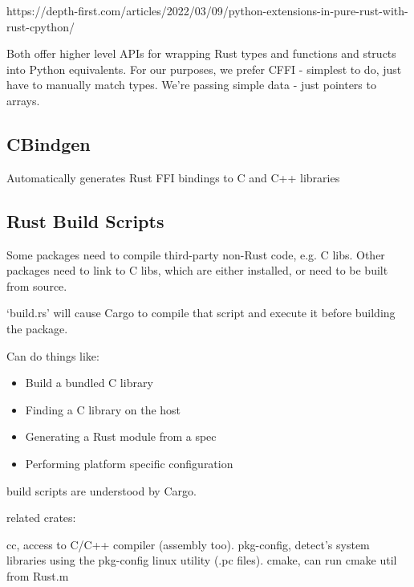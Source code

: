 \documentclass[12pt, a4, twoside]{article}
\begin{document}
https://depth-first.com/articles/2022/03/09/python-extensions-in-pure-rust-with-rust-cpython/

Both offer higher level APIs for wrapping Rust types and functions and structs into Python equivalents. For our purposes, we prefer CFFI - simplest to do, just have to manually match types. We're passing simple data - just pointers to arrays. 

\subsection*{CBindgen}

Automatically generates Rust FFI bindings to C and C++ libraries

\subsection*{Rust Build Scripts}

Some packages need to compile third-party non-Rust code, e.g. C libs. Other packages need to link to C libs,  which are either installed, or need to be built from source.

`build.rs' will cause Cargo to compile that script and execute it before building the package.

Can do things like:

\begin{itemize}
    \item Build a bundled C library
    \item Finding a C library on the host
    \item Generating a Rust module from a spec
    \item Performing platform specific configuration
\end{itemize}


build scripts are understood by Cargo.

related crates:

cc, access to C/C++ compiler (assembly too). pkg-config, detect's system libraries using the pkg-config linux utility (.pc files). cmake, can run cmake util from Rust.m
\end{document}

